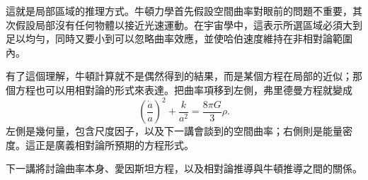 這就是局部區域的推理方式。牛頓力學首先假設空間曲率對眼前的問題不重要，其次假設局部沒有任何物體以接近光速運動。在宇宙學中，這表示所選區域必須大到足以均勻，同時又要小到可以忽略曲率效應，並使哈伯速度維持在非相對論範圍內。

有了這個理解，牛頓計算就不是偶然得到的結果，而是某個方程在局部的近似；那個方程也可以用相對論的形式來表達。把曲率項移到左側，弗里德曼方程就變成
\begin{equation}
\left(\frac{\dot a}{a}\right)^2+\frac{k}{a^2}=\frac{8\pi G}{3}\rho.
\end{equation}
左側是幾何量，包含尺度因子，以及下一講會談到的空間曲率；右側則是能量密度。這正是廣義相對論所預期的方程形式。

下一講將討論曲率本身、愛因斯坦方程，以及相對論推導與牛頓推導之間的關係。
